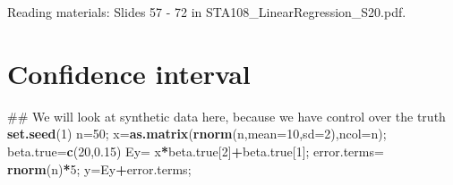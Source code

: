 \documentclass[12pt,]{book}
\newenvironment{Shaded}{\begin{snugshade}}{\end{snugshade}}
\newcommand{\KeywordTok}[1]{\textcolor[rgb]{0.13,0.29,0.53}{\textbf{#1}}}
\newcommand{\DataTypeTok}[1]{\textcolor[rgb]{0.13,0.29,0.53}{#1}}
\newcommand{\DecValTok}[1]{\textcolor[rgb]{0.00,0.00,0.81}{#1}}
\newcommand{\FloatTok}[1]{\textcolor[rgb]{0.00,0.00,0.81}{#1}}
\newcommand{\StringTok}[1]{\textcolor[rgb]{0.31,0.60,0.02}{#1}}
\newcommand{\CommentTok}[1]{\textcolor[rgb]{0.56,0.35,0.01}{\textit{#1}}}
\newcommand{\OperatorTok}[1]{\textcolor[rgb]{0.81,0.36,0.00}{\textbf{#1}}}
\newcommand{\NormalTok}[1]{#1}
\begin{document}
Reading materials: Slides 57 - 72 in STA108\_LinearRegression\_S20.pdf.

\section{Confidence interval}\label{confidence-interval}

\begin{Shaded}
\begin{Highlighting}[]
\NormalTok{## We will look at synthetic data here, because we have control over the truth }
\KeywordTok{set.seed}\NormalTok{(}\DecValTok{1}\NormalTok{)}
\NormalTok{n=}\DecValTok{50}\NormalTok{;}
\NormalTok{x=}\KeywordTok{as.matrix}\NormalTok{(}\KeywordTok{rnorm}\NormalTok{(n,}\DataTypeTok{mean=}\DecValTok{10}\NormalTok{,}\DataTypeTok{sd=}\DecValTok{2}\NormalTok{),}\DataTypeTok{ncol=}\NormalTok{n);}
\NormalTok{beta.true=}\KeywordTok{c}\NormalTok{(}\DecValTok{20}\NormalTok{,}\FloatTok{0.15}\NormalTok{)}
\NormalTok{Ey=}\StringTok{ }\NormalTok{x}\OperatorTok{*}\NormalTok{beta.true[}\DecValTok{2}\NormalTok{]}\OperatorTok{+}\NormalTok{beta.true[}\DecValTok{1}\NormalTok{];}
\NormalTok{error.terms=}\StringTok{ }\KeywordTok{rnorm}\NormalTok{(n)}\OperatorTok{*}\DecValTok{5}\NormalTok{;}
\NormalTok{y=Ey}\OperatorTok{+}\NormalTok{error.terms;}
\end{Highlighting}
\end{Shaded}

\begin{Shaded}
\end{Shaded}
\end{document}
